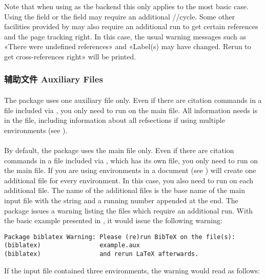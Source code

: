 \BibTeXOnlyMark Note that when using \bibtex as the backend this only applies to the most basic case. Using the  field or the  field may require an additional \latex/\bibtex/\latex cycle. Some other facilities provided by \biblatex may also require an additional  run to get certain references and the page tracking right. In this case, the usual warning messages such as «There were undefined references» and «Label(s) may have changed. Rerun to get cross-references right» will be printed.

\subsubsection{辅助文件 Auxiliary Files}
\label{use:use:aux}

\paragraph{\biber}

The \biblatex package uses one auxiliary  file only. Even if there are citation commands in a file included via , you only need to run \biber on the main  file. All information \biber needs is in the  file, including information about all refsections if using multiple  environments (see ).

\paragraph{\bibtex}

By default, the \biblatex package uses the main  file only. Even if there are citation commands in a file included via , which has its own  file, you only need to run \bibtex on the main  file. If you are using  environments in a document (see ) \biblatex will create one additional  file for every  environment. In this case, you also need to run  on each additional  file. The name of the additional  files is the base name of the main input file with the string  and a running number appended at the end. The \biblatex package issues a warning listing the files which require an additional \bibtex run. With the basic example presented in , it would issue the following warning:

\begin{lstlisting}[style=plain]
Package biblatex Warning: Please (re)run BibTeX on the file(s):
(biblatex)                example.aux
(biblatex)                and rerun LaTeX afterwards.
\end{lstlisting}
%
If the input file contained three  environments, the warning would read as follows:

